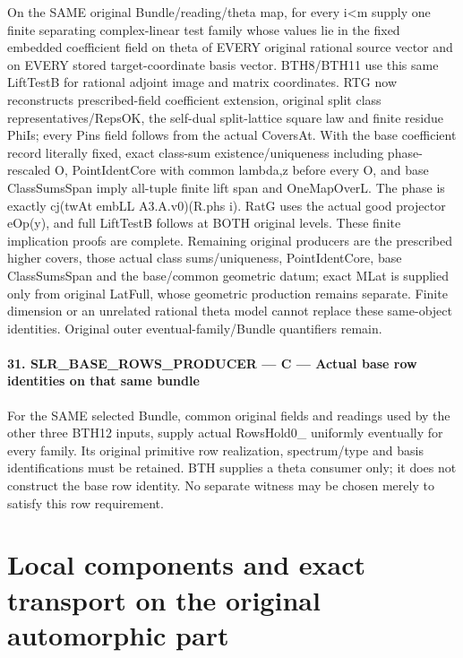 \documentclass[11pt,a4paper]{article}
\numberwithin{equation}{section}
\theoremstyle{remark}\newtheorem{remark}[theorem]{Remark}
\begin{document}
On the SAME original Bundle/reading/theta map, for every i<m supply one finite separating complex-linear test family whose values lie in the fixed embedded coefficient field on theta of EVERY original rational source vector and on EVERY stored target-coordinate basis vector. BTH8/BTH11 use this same LiftTestB for rational adjoint image and matrix coordinates. RTG now reconstructs prescribed-field coefficient extension, original split class representatives/RepsOK, the self-dual split-lattice square law and finite residue PhiIs; every Pins field follows from the actual CoversAt. With the base coefficient record literally fixed, exact class-sum existence/uniqueness including phase-rescaled O, PointIdentCore with common lambda,z before every O, and base ClassSumsSpan imply all-tuple finite lift span and OneMapOverL. The phase is exactly cj(twAt embLL A3.A.v0)(R.phs i). RatG uses the actual good projector eOp(y), and full LiftTestB follows at BOTH original levels. These finite implication proofs are complete. Remaining original producers are the prescribed higher covers, those actual class sums/uniqueness, PointIdentCore, base ClassSumsSpan and the base/common geometric datum; exact MLat is supplied only from original LatFull, whose geometric production remains separate. Finite dimension or an unrelated rational theta model cannot replace these same-object identities. Original outer eventual-family/Bundle quantifiers remain.



\paragraph{31. SLR\_\allowbreak BASE\_\allowbreak ROWS\_\allowbreak PRODUCER — C — Actual base row identities on that same bundle}

For the SAME selected Bundle, common original fields and readings used by the other three BTH12 inputs, supply actual RowsHold0\_ uniformly eventually for every family. Its original primitive row realization, spectrum/type and basis identifications must be retained. BTH supplies a theta consumer only; it does not construct the base row identity. No separate witness may be chosen merely to satisfy this row requirement.



\clearpage
\section{Local components and exact transport on the original automorphic part}
\label{sec:local-transport-v44}
\end{document}
